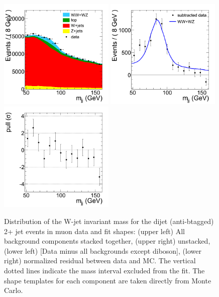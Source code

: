 \begin{figure}[h!]
  {\centering
    \includegraphics[width=0.49\textwidth]{figs/mjjfit/DibosonConvolvedMCTemplatelnujj_muon_Stacked.png}
    \includegraphics[width=0.49\textwidth]{figs/mjjfit/DibosonConvolvedMCTemplatelnujj_muon_Subtracted.png}
    \includegraphics[width=0.49\textwidth]{figs/mjjfit/DibosonConvolvedMCTemplatelnujj_muon_Pull.png}
    \caption{Distribution of the W-jet invariant mass for the dijet (anti-btagged) 2+ jet events in muon data and fit shapes: 
      (upper left) All background components stacked together, 
      (upper right) unstacked, (lower left) [Data minus all backgrounds except diboson],  
      (lower right) normalized residual between data and MC. The vertical dotted lines
      indicate the mass interval excluded from the fit. The shape templates for each component are taken directly from Monte Carlo.}
    \label{fig:mjjfit_ConvolvedMCTemplate_mu}}
\end{figure}
